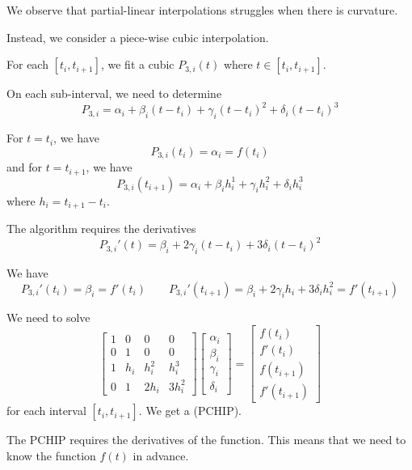 We observe that partial-linear interpolations struggles when there is curvature.

Instead, we consider a piece-wise cubic interpolation.

For each \( [t_i, t_{i+1}] \), we fit a cubic \( P_{3,i}(t) \) where \( t \in [t_i, t_{i+1}] \).

On each sub-interval, we need to determine \[
    P_{3,i} = \alpha_i + \beta_i(t - t_i) + \gamma_i(t - t_i)^2 + \delta_i(t - t_i)^3
\]

For \( t = t_i \), we have \[
    P_{3,i}(t_i) = \alpha_i = f(t_i)
\] and for \( t = t_{i+1} \), we have \[
    P_{3,i}(t_{i+1}) = \alpha_i + \beta_i h_i^1 + \gamma_i h_i^2 + \delta_i h_i^3
\] where \( h_i = t_{i+1} - t_i \).

\begin{remark}
    The algorithm requires the derivatives \[
        P_{3,i}'(t) = \beta_i + 2\gamma_i(t - t_i) + 3\delta_i(t - t_i)^2
    \]

    We have \[
        P_{3,i}'(t_i) = \beta_i = f'(t_i)
        \qquad
        P_{3,i}'(t_{i+1}) = \beta_i + 2\gamma_i h_i + 3\delta_i h_i^2 = f'(t_{i+1})
    \]
\end{remark}

We need to solve \[
    \begin{bmatrix}
        1 & 0   & 0     & 0      \\
        0 & 1   & 0     & 0      \\
        1 & h_i & h_i^2 & h_i^3  \\
        0 & 1   & 2h_i  & 3h_i^2
    \end{bmatrix} \begin{bmatrix}
        \alpha_i \\ \beta_i \\ \gamma_i \\ \delta_i
    \end{bmatrix} = \begin{bmatrix}
        f(t_i) \\ f'(t_i) \\ f(t_{i+1}) \\ f'(t_{i+1})
    \end{bmatrix}
\] for each interval \( [t_i, t_{i+1}] \). We get a  (PCHIP).

\begin{remark}[Caveat]
    The PCHIP requires the derivatives of the function. This means that we need to know the function \( f(t) \) in advance.
\end{remark}

